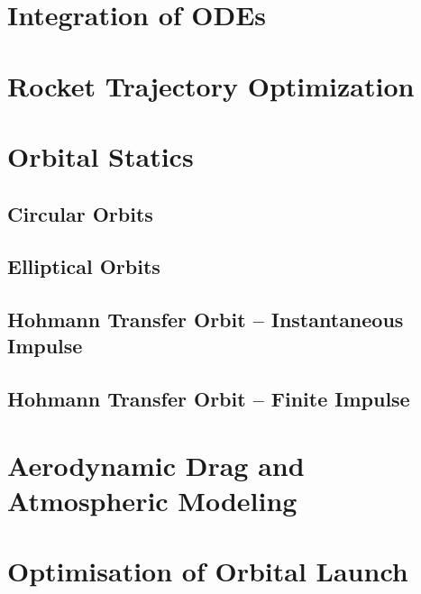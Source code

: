 \documentclass[12pt,openany]{book}
\begin{document}
\chapter{Integration of ODEs}
\chapter{Rocket Trajectory Optimization}
\chapter{Orbital Statics}
\section{Circular Orbits}
\section{Elliptical Orbits}
\section{Hohmann Transfer Orbit -- Instantaneous Impulse}
\section{Hohmann Transfer Orbit -- Finite Impulse}
\chapter{Aerodynamic Drag and Atmospheric Modeling}
\chapter{Optimisation of Orbital Launch}

\printunsrtglossary[type=symbols,style=long]

\clearpage{}
{}


\end{document}
